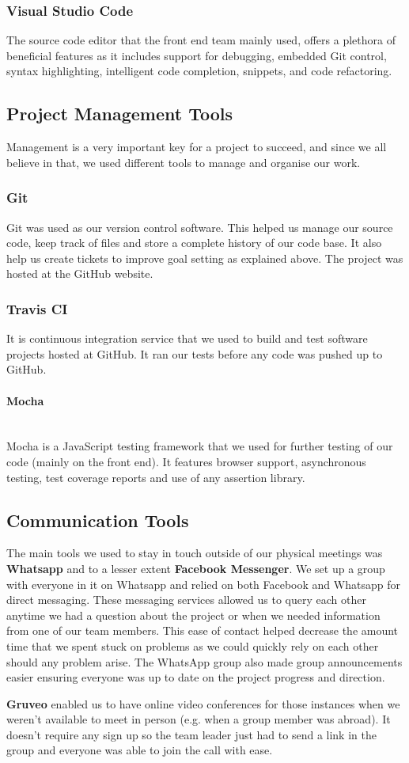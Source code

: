 \documentclass[a4paper]{report}
\newcommand{
	\subsubsubsection}[1]
{\paragraph{#1}\mbox{}\\[.35em]}
\begin{document}
	\subsubsection{Visual Studio Code}
	The source code editor that the front end team mainly used, offers a plethora of beneficial features as it includes support for debugging, embedded Git control, syntax highlighting, intelligent code completion, snippets, and code refactoring. 
	\subsection{Project Management Tools}
	Management is a very important key for a project to succeed, and since we all believe in that, we used different tools to manage and organise our work. 
	\subsubsection{Git}
	Git was used as our version control software. This helped us manage our source code, keep track of files and store a complete history of our code base. It also help us create tickets to improve goal setting as explained above. The project was hosted at the GitHub website.
	\subsubsection{Travis CI}
	It is continuous integration service that we used to build and test software projects hosted at GitHub. It ran our tests before any code was pushed up to GitHub.
	\subsubsubsection{Mocha}
	Mocha is a JavaScript testing framework that we used for further testing of our code (mainly on the front end). It features browser support, asynchronous testing, test coverage reports and use of any assertion library. \cite{dzone_mocha_2018}
	\subsection{Communication Tools}
	The main tools we used to stay in touch outside of our physical meetings was \textbf{Whatsapp} and to a lesser extent \textbf{Facebook Messenger}. We set up a group with everyone in it on Whatsapp and relied on both Facebook and Whatsapp for direct messaging. These messaging services allowed us to query each other anytime we had a question about the project or when we needed information from one of our team members. This ease of contact helped decrease the amount time that we spent stuck on problems as we could quickly rely on each other should any problem arise. The WhatsApp group also made group announcements easier ensuring everyone was up to date on the project progress and direction.\newline
	\par\textbf{Gruveo} enabled us to have online video conferences for those instances when we weren't available to meet in person (e.g. when a group member was abroad). It doesn't require any sign up so the team leader just had to send a link in the group and everyone was able to join the call with ease.
\end{document}
